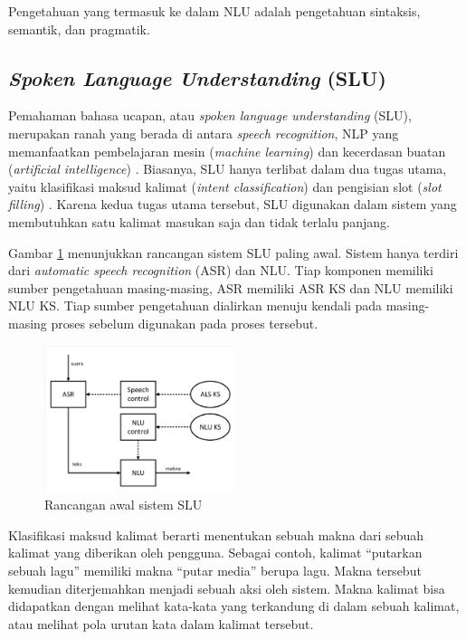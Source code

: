 Pengetahuan yang termasuk ke dalam NLU adalah pengetahuan sintaksis, semantik, dan pragmatik.

\subsection{\textit{Spoken Language Understanding} (SLU)}

Pemahaman bahasa ucapan, atau \textit{spoken language understanding} (SLU), merupakan ranah yang berada di antara \textit{speech recognition}, NLP yang memanfaatkan pembelajaran mesin (\textit{machine learning}) dan kecerdasan buatan (\textit{artificial intelligence}) \parencite{tur2011spoken}. Biasanya, SLU hanya terlibat dalam dua tugas utama, yaitu klasifikasi maksud kalimat (\textit{intent classification}) dan pengisian slot (\textit{slot filling}) \parencite{goo2018slot}. Karena kedua tugas utama tersebut, SLU digunakan dalam sistem yang membutuhkan satu kalimat masukan saja dan tidak terlalu panjang.

Gambar \ref{fig:slu_early} menunjukkan rancangan sistem SLU paling awal. Sistem hanya terdiri dari \textit{automatic speech recognition} (ASR) dan NLU. Tiap komponen memiliki sumber pengetahuan masing-masing, ASR memiliki ASR KS dan NLU memiliki NLU KS. Tiap sumber pengetahuan dialirkan menuju kendali pada masing-masing proses sebelum digunakan pada proses tersebut.

\begin{figure}[H]
	\centering
	\includegraphics[width=0.5\textwidth, trim=2 2 2 2, clip]{resources/2-early_slu.pdf}
	\caption{Rancangan awal sistem SLU \parencite{tur2011spoken}}
	\label{fig:slu_early}
\end{figure}

Klasifikasi maksud kalimat berarti menentukan sebuah makna dari sebuah kalimat yang diberikan oleh pengguna. Sebagai contoh, kalimat “putarkan sebuah lagu” memiliki makna “putar media” berupa lagu. Makna tersebut kemudian diterjemahkan menjadi sebuah aksi oleh sistem. Makna kalimat bisa didapatkan dengan melihat kata-kata yang terkandung di dalam sebuah kalimat, atau melihat pola urutan kata dalam kalimat tersebut.

